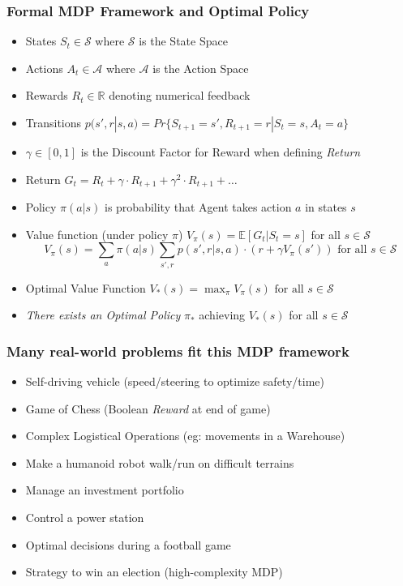 \documentclass[handout]{beamer}
\begin{document}
\begin{frame}
\frametitle{Formal MDP Framework and Optimal Policy}
\pause
\begin{itemize}[<+->]
\item States $S_t \in \mathcal{S}$ where $\mathcal{S}$ is the State Space
\item Actions $A_t \in \mathcal{A}$ where $\mathcal{A}$ is the Action Space
\item Rewards $R_t \in \mathbb{R}$ denoting numerical feedback\
\item Transitions $p(s',r|s,a) = Pr\{S_{t+1}=s',R_{t+1}=r|S_t=s,A_t=a\}$
\item $\gamma \in [0,1]$ is the Discount Factor for Reward when defining {\em Return}
\item Return $G_t = R_t + \gamma \cdot R_{t+1} + \gamma^2 \cdot R_{t+1} + \ldots$
\item Policy $\pi(a|s)$ is probability that Agent takes action $a$ in states $s$
\item Value function (under policy $\pi$) $V_{\pi}(s) = \mathbb{E}[G_t|S_t = s]$ for all $s \in \mathcal{S}$
$$V_{\pi}(s) = \sum_{a} \pi(a|s) \sum_{s',r} p(s',r|s,a) \cdot (r + \gamma V_{\pi}(s')) \mbox{ for all } s \in \mathcal{S}$$
\item Optimal Value Function $V_{*}(s) = \max_{\pi} V_{\pi}(s) \mbox{ for all } s \in \mathcal{S}$
\item {\em There exists an Optimal Policy} $\pi_{*}$ achieving $V_{*}(s)$ for all $s \in \mathcal{S}$
\end{itemize}

\end{frame}

\begin{frame}
\frametitle{Many real-world problems fit this MDP framework}
\pause
\begin{itemize}[<+->]
\item Self-driving vehicle (speed/steering to optimize safety/time)
\item Game of Chess (Boolean {\em Reward} at end of game)
\item Complex Logistical Operations (eg: movements in a Warehouse)
\item Make a humanoid robot walk/run on difficult terrains
\item Manage an investment portfolio
\item Control a power station
\item Optimal decisions during a football game
\item Strategy to win an election (high-complexity MDP)
\end{itemize}
\end{frame}
\end{document}
